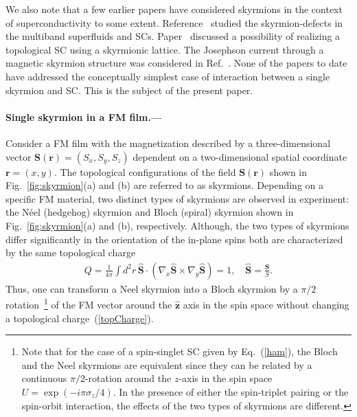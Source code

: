 \documentclass[twocolumn,showpacs,floatfix,longbibliography]{revtex4-1}
\begin{document}
We also note that a few earlier papers have considered skyrmions in the context of superconductivity to some extent. Reference~\cite{Garaud2011} studied the skyrmion-defects in the multiband superfluids and SCs. Paper~\cite{Nakosai2013} discussed a possibility of realizing a topological SC using a skyrmionic lattice. The Josephson current through a magnetic skyrmion structure was considered in Ref.~\cite{Yokoyama2015}. None of the papers to date have addressed the conceptually simplest case of interaction between a single skyrmion and SC. This is the subject of the present paper.

\paragraph*{Single skyrmion in a FM film.---} \label{sec:skyrmion}


Consider a FM film with the magnetization described by a three-dimensional vector $\bm S(\bm r) = (S_x,S_y,S_z)$ dependent on a two-dimensional spatial coordinate $\bm r = (x,y)$. The topological configurations of the field $\bm S(\bm r)$ shown in Fig.~\ref{fig:skyrmion}(a) and (b) are referred to as skyrmions.  Depending on a specific FM material, two distinct types of skyrmions are observed in experiment: the N\'eel (hedgehog) skyrmion and Bloch (spiral) skyrmion shown in Fig.~\ref{fig:skyrmion}(a) and (b), respectively. Although, the two types of skyrmions differ significantly in the orientation of the in-plane spins both are characterized by the same topological charge
\begin{align}
	Q = \frac{1}{4\pi} \int d^2r \, \hat {\bm S}\cdot (\nabla_x\hat {\bm S}\times\nabla_y\hat {\bm S})=1,\quad  \hat {\bm S}= \frac{\bm S}{S}.
	\label{topCharge}
\end{align}
Thus, one can transform a Neel skyrmion into a Bloch skyrmion by a $\pi/2$ rotation~\footnote{Note that for the case of a spin-singlet SC given by Eq.~(\ref{ham}), the Bloch and the Neel skyrmions are equivalent since they can be related by a continuous $\pi/2$-rotation around the $z$-axis in the spin space $U = \exp(-i\pi\sigma_z/4)$. In the presence of either the spin-triplet pairing or the spin-orbit interaction, the effects of the two types of skyrmions are different.} of the FM vector around the $\hat {\bm z}$ axis in the spin space without changing a topological charge~(\ref{topCharge}).
\end{document}
